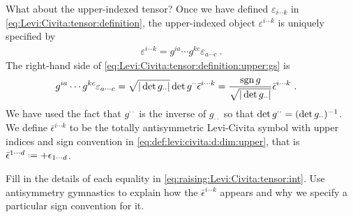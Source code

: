 \documentclass[12pt, oneside]{report}    %
\begin{document}
\begin{subappendices}
What about the upper-indexed tensor? Once we have defined $\varepsilon_{i\cdots k}$ in \eqref{eq:Levi:Civita:tensor:definition}, the upper-indexed object $\varepsilon^{i\cdots k}$ is uniquely specified by
\begin{align}
    \varepsilon^{i\cdots k}
    =
    g^{ia}\cdots g^{kc}
    \varepsilon_{a\cdots c} \ .
    \label{eq:Levi:Civita:tensor:definition:upper:gs}
\end{align}
The right-hand side of \eqref{eq:Levi:Civita:tensor:definition:upper:gs} is
\begin{align}
    g^{ia}\cdots g^{kc}
    \varepsilon_{a\cdots c}
    &=
    \sqrt{|\det g_{\cdot\cdot}|}
    \det{g^{\cdot\cdot}}
    \bar{\epsilon}^{i\cdots k}
    =
    \frac{\operatorname{\textnormal{sgn}}{g}}{\sqrt{|\det{g_{\cdot\cdot}}|}}
    \bar{\epsilon}^{i\cdots k} 
    \ .
    \label{eq:raising:Levi:Civita:tensor:int}
\end{align}
We have used the fact that $g^{\cdot\cdot}$ is the inverse of $g_{\cdot\cdot}$ so that $\det{g^{\cdot\cdot}} = (\det g_{\cdot\cdot})^{-1}$. 
% 
We define $\bar\epsilon^{i\cdots k}$ to be the totally antisymmetric Levi-Civita symbol with upper indices and sign convention in \eqref{eq:def:levi:civita:d:dim:upper}, that is $\bar\epsilon^{1\cdots d} \defeq +\epsilon_{1\cdots d}$.
\begin{exercise}
Fill in the details of each equality in \eqref{eq:raising:Levi:Civita:tensor:int}. Use antisymmetry gymnastics to explain how the $\bar\epsilon^{i\cdots k}$ appears and why we specify a particular sign convention for it.

\end{exercise}
\end{subappendices}
\end{document}
